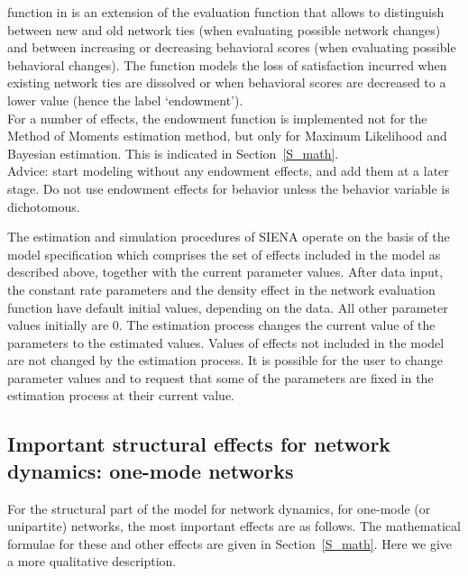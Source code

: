 \documentclass[a4paper,fleqn]{article}
\newcommand{\+}{\, + \,}
\newcommand{\SI}{{\sf SIENA }}
\begin{document}
{\begin{itemize}
{{function} in \citet{Snijders01}} is an extension of the evaluation
function that allows to distinguish between new and old network
ties (when evaluating possible network changes) and between
increasing or decreasing behavioral scores (when evaluating
possible behavioral changes). The function models the loss of
satisfaction incurred when existing network ties are dissolved or
when behavioral scores
are decreased to a lower value (hence the label `endowment').\\
For a number of effects, the endowment function is implemented
not for the Method of Moments estimation method,
but only for Maximum Likelihood and Bayesian estimation.
This is indicated in Section~\ref{S_math}.\\
Advice: start modeling without any endowment effects,
and add them at a later stage.
Do not use endowment effects for behavior unless
the behavior variable is dichotomous.
\end{itemize}

The estimation and simulation procedures of \SI operate on the basis
of the model specification which comprises the set of
effects included in the model as described above,
together with the current
parameter values.
After data input, the constant rate
parameters and the density effect in the network evaluation function
have default initial values, depending on the data. All other
parameter values initially are 0. The estimation process changes
the current value of the parameters to the estimated values.
Values of effects not included in the model are not changed by the
estimation process. It is possible for the user to change
parameter values and to request that some of the parameters are
fixed in the estimation process at their current value.

\subsection{Important structural effects for network dynamics:
           \protect\newline one-mode networks}
\label{S_imp_str1}

For the structural part of the model for network dynamics,
for one-mode (or unipartite) networks,
the most important effects are as follows.
The mathematical formulae for these and other effects are given
in Section~\ref{S_math}. Here we give a more qualitative description.

}
\end{document}
